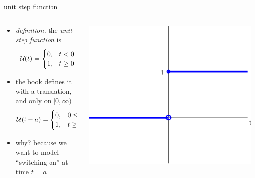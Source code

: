 \documentclass[dvipsnames,colorlinks]{beamer}
\begin{document}
\begin{frame}{unit step function}

\begin{columns}
\begin{column}{0.65\textwidth}
\begin{itemize}
\item \emph{definition.}  the \emph{unit step function} is
    $$\mathcal{U}(t) = \begin{cases} 0, & t < 0 \\
                             1, & t \ge 0 \end{cases}$$
\item the book defines it with a translation, and only on $[0,\infty)$
    $$\mathcal{U}(t-a) = \begin{cases} 0, & 0\le t < a \\
                               1, & t \ge a \end{cases}$$
\item why? because we want to model ``switching on'' at time $t=a$
\end{itemize}
\end{column}
\begin{column}{0.35\textwidth}
\includegraphics[width=\textwidth]{figs/unitstep}


\end{column}
\end{columns}
\end{frame}
\end{document}

